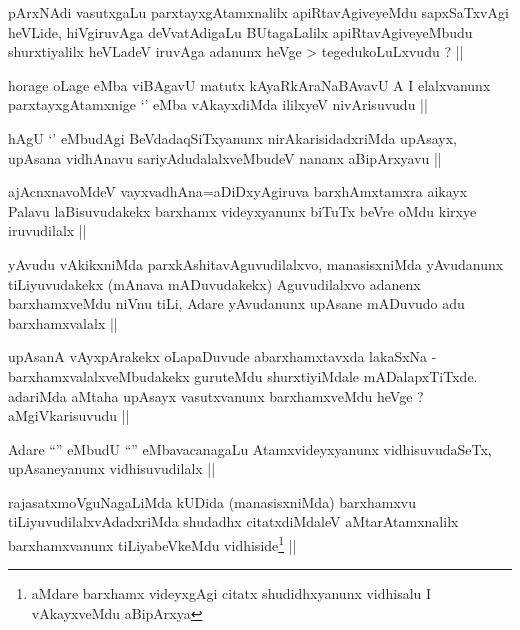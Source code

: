 \begin{artha}
pArxNAdi vasutxgaLu parxtayxgAtamxnalilx apiRtavAgiveyeMdu
sapxSaTxvAgi heVLide, hiVgiruvAga deVvatAdigaLu BUtagaLalilx
apiRtavAgiveyeMbudu shurxtiyalilx heVLadeV iruvAga adanunx heVge >
tegedukoLuLxvudu ? ||
\end{artha}

\begin{artha}
horage oLage eMba viBAgavU matutx kAyaRkAraNaBAvavU A I elalxvanunx
parxtayxgAtamxnige `\stext' eMba vAkayxdiMda ililxyeV nivArisuvudu ||
\end{artha}

\begin{artha}
hAgU `\stext' eMbudAgi BeVdadaqSiTxyanunx nirAkarisidadxriMda upAsayx,
upAsana vidhAnavu sariyAdudalalxveMbudeV nananx aBipArxyavu ||
\end{artha}

\begin{artha}
ajAcnxnavoMdeV vayxvadhAna=aDiDxyAgiruva barxhAmxtamxra aikayx Palavu
laBisuvudakekx barxhamx videyxyanunx biTuTx beVre oMdu kirxye
iruvudilalx ||
\end{artha}


\begin{artha}
yAvudu vAkikxniMda parxkAshitavAguvudilalxvo, manasisxniMda yAvudanunx
tiLiyuvudakekx (mAnava mADuvudakekx) Aguvudilalxvo adanenx
barxhamxveMdu niVnu tiLi, Adare yAvudanunx upAsane mADuvudo adu
barxhamxvalalx ||
\end{artha}

\begin{artha}
upAsanA vAyxpArakekx oLapaDuvude abarxhamxtavxda lakaSxNa -
barxhamxvalalxveMbudakekx guruteMdu shurxtiyiMdale
mADalapxTiTxde. adariMda aMtaha upAsayx vasutxvanunx barxhamxveMdu
heVge ? aMgiVkarisuvudu ||
\end{artha}

\begin{artha}
Adare ``\stext'' eMbudU ``\stext'' eMbavacanagaLu Atamxvideyxyanunx
vidhisuvudaSeTx, upAsaneyanunx vidhisuvudilalx ||
\end{artha}

\begin{artha}
rajasatxmoVguNagaLiMda kUDida (manasisxniMda) barxhamxvu
tiLiyuvudilalxvAdadxriMda shudadhx citatxdiMdaleV aMtarAtamxnalilx
barxhamxvanunx tiLiyabeVkeMdu  vidhiside\footnote[1]{aMdare barxhamx
  videyxgAgi citatx shudidhxyanunx vidhisalu I vAkayxveMdu aBipArxya} ||
\end{artha}

